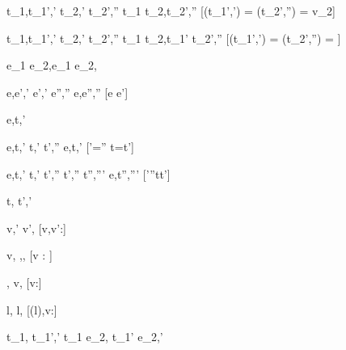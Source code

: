   {t_1,\sigma  \stride t_1',\sigma'  \Quad
   t_2,\sigma' \stride t_2',\sigma''}
  {t_1 \Choose t_2,\sigma \stride t_2',\sigma''}
  [\Value(t_1',\sigma') = \bot \land \Value(t_2',\sigma'') = v_2]

  {t_1,\sigma  \stride t_1',\sigma'  \Quad
   t_2,\sigma' \stride t_2',\sigma''}
  {t_1 \Choose t_2,\sigma \stride t_1' \Choose t_2',\sigma''}
  [\Value(t_1',\sigma') = \bot \land \Value(t_2',\sigma'') = \bot]


  { }
  {e_1 \Pick e_2,\sigma \stride e_1 \Pick e_2,\sigma}

    {e,\sigma \eval e',\sigma'  \Quad
     e',\sigma' \stride e'',\sigma''}
    {e,\sigma \stride e'',\sigma''}
    [e \neq e']



  {e,\sigma \normalise t,\sigma'}


    {e,\sigma \eval t,\sigma' \Quad
     t,\sigma' \stride t',\sigma''}
    {e,\sigma \normalise t,\sigma'}
    [\sigma'=\sigma'' \land t=t']

    {e,\sigma \eval t,\sigma'  \Quad
     t,\sigma' \stride t',\sigma''  \Quad
     t',\sigma'' \normalise t'',\sigma'''}
    {e,\sigma \normalise t'',\sigma'''}
    [\sigma'\neq \sigma''\vee t\neq t']




  {t,\sigma {} t',\sigma'}


  { }
  {\Update v,\sigma {}' \Update v',\sigma}
  [v,v':\tau]

  { }
  {\Update v,\sigma \handle{\Empty} \Enter \tau,\sigma,\True}
  [v : \tau]

  { }
  {\Enter \tau,\sigma {} \Update v,\sigma}
  [v:\tau]

  { }
  {\Update l,\sigma {} \Update l,\sigma[l \mapsto v]}
  [\sigma(l),v:\tau]

  {t_1,\sigma {} t_1',\sigma'}
  {t_1 \Step e_2,\sigma {} t_1' \Step e_2,\sigma'}




